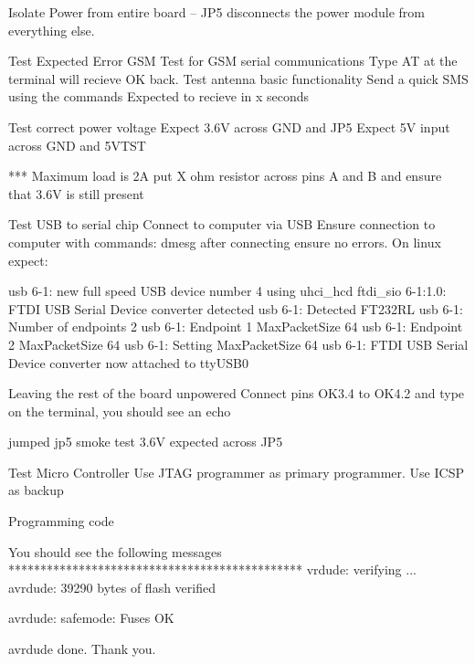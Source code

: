\documentclass[]{article}
\begin{document}
                 Isolate Power from entire board
                 -- JP5 disconnects the power module from everything else.

            Test
            Expected
            Error
            GSM
            Test for GSM serial communications
            Type AT at the terminal will recieve OK back.
            Test antenna basic functionality
            Send a quick SMS using the commands
            Expected to recieve in x seconds

            Test correct power voltage
            Expect 3.6V across GND and JP5
            Expect 5V input across GND and 5VTST

            ***  Maximum load is 2A put X ohm resistor across pins A and B and ensure that 3.6V is still present

            Test USB to serial chip
            Connect to computer via USB
            Ensure connection to computer with commands:
                dmesg after connecting ensure no errors. On linux expect:
             
                usb 6-1: new full speed USB device number 4 using uhci_hcd
                ftdi_sio 6-1:1.0: FTDI USB Serial Device converter detected
                usb 6-1: Detected FT232RL
                usb 6-1: Number of endpoints 2
                usb 6-1: Endpoint 1 MaxPacketSize 64
                usb 6-1: Endpoint 2 MaxPacketSize 64
                usb 6-1: Setting MaxPacketSize 64
                usb 6-1: FTDI USB Serial Device converter now attached to ttyUSB0

            Leaving the rest of the board unpowered
            Connect pins OK3.4 to OK4.2 and type on the terminal, you should see an echo

            jumped jp5
            smoke test
            3.6V expected across JP5
            

            Test Micro Controller
                Use JTAG programmer as primary programmer. Use ICSP as backup
                
                Programming code
                

                You should see the following messages
                **********************************************
                vrdude: verifying ...
                avrdude: 39290 bytes of flash verified

                avrdude: safemode: Fuses OK

                avrdude done.  Thank you.
\end{document}
